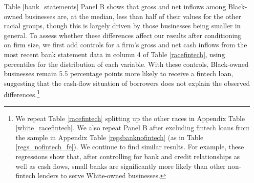 \documentclass[11pt]{article}
\begin{document}
Table \ref{bank_statements} Panel B shows that gross and net inflows among Black-owned businesses are, at the median, less than half of their values for the other racial groups, though this is largely driven by those businesses being smaller in general. To assess whether these differences affect our results after conditioning on firm size, we first add controls for a firm's gross and net cash inflows from the most recent bank statement data in column 4 of Table \ref{racefintech}, using percentiles for the distribution of each variable. With these controls, Black-owned businesses remain 5.5 percentage points more likely to receive a fintech loan, suggesting that the cash-flow situation of borrowers does not explain the observed differences.\footnote{We repeat Table \ref{racefintech} splitting up the other races in Appendix Table \ref{white_racefintech}. We also repeat Panel B after excluding fintech loans from the sample in Appendix Table \ref{regsbanknofintech} (as in Table \ref{regs_nofintech_fe}). We continue to find similar results. For example, these regressions show that, after controlling for bank and credit relationships as well as cash flows, small banks are significantly more likely than other non-fintech lenders to serve White-owned businesses.}
	
\end{document}
